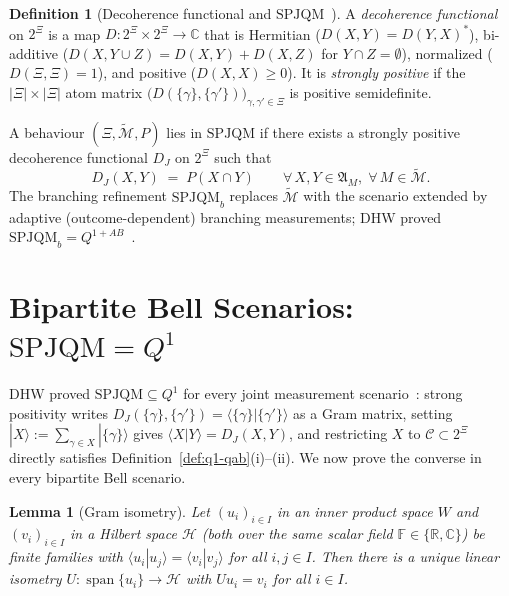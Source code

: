 \documentclass[11pt,a4paper]{article}
\newtheorem{lemma}[theorem]{Lemma}
\theoremstyle{definition}
\newtheorem{definition}[theorem]{Definition}
\theoremstyle{remark}
\newcommand{\HH}{\mathcal{H}}
\newcommand{\tcM}{\widetilde{\mathcal{M}}}
\newcommand{\cC}{\mathcal{C}}
\newcommand{\EA}{\mathfrak{A}}
\newcommand{\SPJQM}{\mathrm{SPJQM}}
\newcommand{\SPJQMb}{\mathrm{SPJQM}_b}
\newcommand{\Qone}{Q^{1}}
\newcommand{\QAB}{Q^{1+AB}}
\newcommand{\ket}[1]{|#1\rangle}
\newcommand{\braket}[2]{\langle #1 | #2 \rangle}
\newcommand{\F}{\mathbb{F}}
\begin{document}
\begin{definition}[Decoherence functional and $\SPJQM$~\cite{DHW2014}]
A \emph{decoherence functional} on $2^{\Xi}$ is a map $D : 2^{\Xi} \times 2^{\Xi} \to \mathbb{C}$ that is Hermitian ($D(X,Y) = D(Y,X)^*$), bi-additive ($D(X, Y\cup Z) = D(X,Y)+D(X,Z)$ for $Y \cap Z = \emptyset$), normalized ($D(\Xi,\Xi) = 1$), and positive ($D(X,X) \ge 0$). It is \emph{strongly positive} if the $|\Xi| \times |\Xi|$ atom matrix $\bigl(D(\{\gamma\},\{\gamma'\})\bigr)_{\gamma,\gamma' \in \Xi}$ is positive semidefinite.

A behaviour $(\Xi, \tcM, P)$ lies in $\SPJQM$ if there exists a strongly positive decoherence functional $D_J$ on $2^{\Xi}$ such that
\begin{equation}\label{eq:spjqm-def}
D_J(X, Y) \;=\; P(X \cap Y) \qquad \forall\, X, Y \in \EA_M,\;\forall\, M \in \tcM.
\end{equation}
The branching refinement $\SPJQMb$ replaces $\tcM$ with the scenario extended by adaptive (outcome-dependent) branching measurements; DHW proved $\SPJQMb = \QAB$~\cite[Thm.~21]{DHW2014}.
\end{definition}

\section{Bipartite Bell Scenarios: $\SPJQM = \Qone$}
\label{sec:bipartite}

DHW proved $\SPJQM \subseteq \Qone$ for every joint measurement scenario~\cite[Thm.~15]{DHW2014}: strong positivity writes $D_J(\{\gamma\},\{\gamma'\}) = \braket{\{\gamma\}}{\{\gamma'\}}$ as a Gram matrix, setting $\ket{X} := \sum_{\gamma \in X}\ket{\{\gamma\}}$ gives $\braket{X}{Y} = D_J(X,Y)$, and restricting $X$ to $\cC \subset 2^{\Xi}$ directly satisfies Definition~\ref{def:q1-qab}(i)--(ii). We now prove the converse in every bipartite Bell scenario.

\begin{lemma}[Gram isometry]
\label{lem:gram}
Let $(u_i)_{i \in I}$ in an inner product space $W$ and $(v_i)_{i \in I}$ in a Hilbert space $\HH$ (both over the same scalar field $\F \in \{\mathbb{R},\mathbb{C}\}$) be finite families with $\braket{u_i}{u_j} = \braket{v_i}{v_j}$ for all $i, j \in I$. Then there is a unique linear isometry $U : \operatorname{span}\{u_i\} \to \HH$ with $U u_i = v_i$ for all $i \in I$.
\end{lemma}
\end{document}
